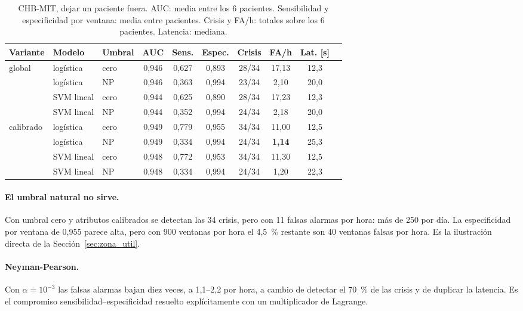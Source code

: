 \begin{table}[ht]
\centering
\caption{CHB-MIT, dejar un paciente fuera. AUC: media entre los 6 pacientes. Sensibilidad y especificidad por ventana:
media entre pacientes. Crisis y FA/h: totales sobre los 6 pacientes. Latencia: mediana.}
\label{tab:lopo_resumen}
\small
\begin{tabular}{lllccccccc}
\toprule
Variante & Modelo & Umbral & AUC & Sens. & Espec. & Crisis & FA/h & Lat. [s] \\
\midrule
\multirow{4}{*}{global}
 & logística & cero & 0,946 & 0,627 & 0,893 & 28/34 & 17,13 & 12,3 \\
 & logística & NP   & 0,946 & 0,363 & 0,994 & 23/34 & 2,10  & 20,0 \\
 & SVM lineal & cero & 0,944 & 0,625 & 0,890 & 28/34 & 17,23 & 12,3 \\
 & SVM lineal & NP   & 0,944 & 0,352 & 0,994 & 24/34 & 2,18  & 20,0 \\
\midrule
\multirow{4}{*}{calibrado}
 & logística & cero & 0,949 & 0,779 & 0,955 & 34/34 & 11,00 & 12,5 \\
 & logística & NP   & 0,949 & 0,334 & 0,994 & 24/34 & \textbf{1,14} & 25,3 \\
 & SVM lineal & cero & 0,948 & 0,772 & 0,953 & 34/34 & 11,30 & 12,5 \\
 & SVM lineal & NP   & 0,948 & 0,334 & 0,994 & 24/34 & 1,20  & 22,3 \\
\bottomrule
\end{tabular}
\end{table}

\paragraph{El umbral natural no sirve.} Con umbral cero y atributos calibrados se detectan las 34 crisis, pero con 11
falsas alarmas por hora: más de 250 por día. La especificidad por ventana de 0,955 parece alta, pero con 900 ventanas
por hora el 4,5~\% restante son 40 ventanas falsas por hora. Es la ilustración directa de la
Sección~\ref{sec:zona_util}.

\paragraph{Neyman-Pearson.} Con $\alpha = 10^{-3}$ las falsas alarmas bajan diez veces, a 1,1--2,2 por hora, a cambio de
detectar el 70~\% de las crisis y de duplicar la latencia. Es el compromiso sensibilidad--especificidad resuelto
explícitamente con un multiplicador de Lagrange.


